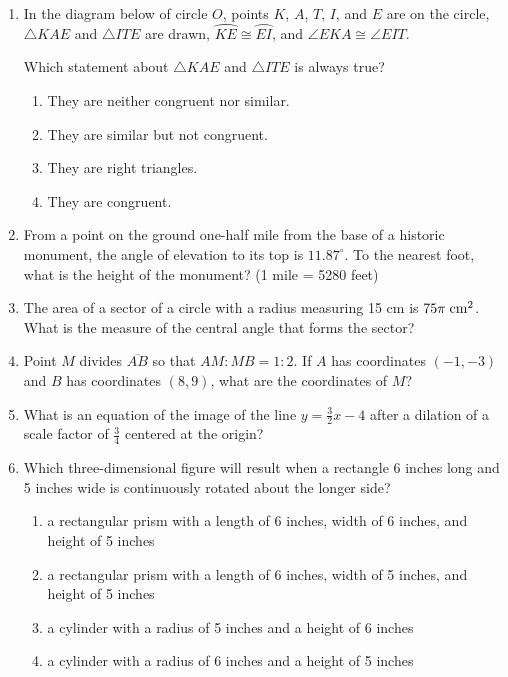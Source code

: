 \documentclass[12pt, oneside]{article}
\begin{document}
\begin{enumerate}[itemsep=0.5cm]
\item In the diagram below of circle $O$, points $K$, $A$, $T$, $I$, and $E$ are on the circle, $\triangle KAE$ and $\triangle ITE$ are drawn, $\wideparen{KE} \cong \wideparen{EI}$, and $\angle EKA \cong \angle EIT$.
\begin{center}
  \end{center}
  Which statement about $\triangle KAE$ and $\triangle ITE$ is always true?
  \begin{enumerate}
    \item They are neither congruent nor similar.
    \item They are similar but not congruent.
    \item They are right triangles.
    \item They are congruent.
  \end{enumerate}

\item From a point on the ground one-half mile from the base of a historic monument, the angle of elevation to its top is $11.87^\circ$. To the nearest foot, what is the height of the monument? (1 mile = 5280 feet)

\item The area of a sector of a circle with a radius measuring 15 cm is $75\pi \; \rm{cm}^2$. What is the measure of the central angle that forms the sector?

\item Point $M$ divides $\overline{AB}$ so that $AM:MB = 1:2$. If $A$ has coordinates $(-1,-3)$ and $B$ has coordinates $(8,9)$, what are the coordinates of $M$?

\item What is an equation of the image of the line $\displaystyle y=\frac{3}{2}x-4$ after a dilation of a scale factor of $\displaystyle \frac{3}{4}$ centered at the origin?

\item Which three-dimensional figure will result when a rectangle 6 inches long and 5 inches wide is continuously rotated about the longer side?
\begin{enumerate}
  \item a rectangular prism with a length of 6 inches, width of 6 inches, and height of 5 inches
  \item a rectangular prism with a length of 6 inches, width of 5 inches, and height of 5 inches
  \item a cylinder with a radius of 5 inches and a height of 6 inches
  \item a cylinder with a radius of 6 inches and a height of 5 inches
\end{enumerate}


\end{enumerate}
\end{document}
